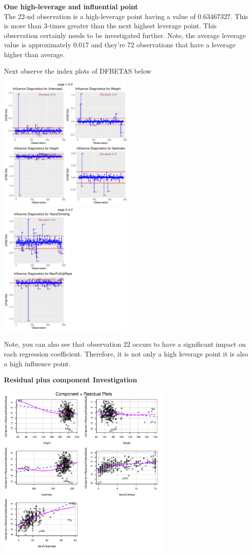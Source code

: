 \documentclass[11pt]{amsart}
\begin{document}
\newpage
{\bf One high-leverage and influential point}\\
The $22$-nd observation is a high-leverage point having a value of $0.63467327$.
This is more than $3$-times greater than the next highest leverage point.
This observation certainly needs to be investigated further.
Note, the average leverage value is approximately $0.017$ and they're $72$ observations that have a leverage higher than average.

Next observe the index plots of DFBETAS below
\begin{center}
\includegraphics[width=0.5\textwidth]{8.pdf}
\includegraphics[width=0.5\textwidth]{9.pdf}
\end{center}
Note, you can also see that observation 22 occurs to have a significant impact on each regression coefficient.
Therefore, it is not only a high leverage point it is also a high influence point.

\newpage
{\bf Residual plus component Investigation}\\
\begin{center}
\includegraphics[width=0.65\textwidth]{10.pdf}
\end{center}
\end{document}
